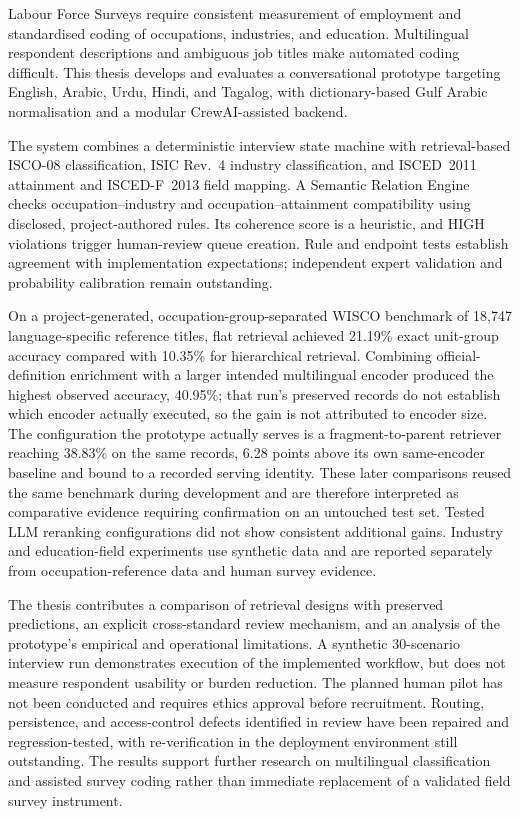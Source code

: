 \documentclass[12pt,a4paper]{report}
\theoremstyle{plain}
\theoremstyle{definition}
\theoremstyle{remark}
\begin{document}
Labour Force Surveys require consistent measurement of employment and
standardised coding of occupations, industries, and education. Multilingual
respondent descriptions and ambiguous job titles make automated coding
difficult. This thesis develops and evaluates a conversational prototype
targeting English, Arabic, Urdu, Hindi, and Tagalog, with dictionary-based
Gulf Arabic normalisation and a modular CrewAI-assisted backend.

The system combines a deterministic interview state machine with
retrieval-based ISCO-08 classification, ISIC Rev.~4 industry classification,
and ISCED~2011 attainment and ISCED-F~2013 field mapping. A Semantic Relation
Engine checks occupation--industry and occupation--attainment compatibility
using disclosed, project-authored rules. Its coherence score is a heuristic,
and HIGH violations trigger human-review queue creation. Rule and endpoint
tests establish agreement with implementation expectations; independent
expert validation and probability calibration remain outstanding.

On a project-generated, occupation-group-separated WISCO benchmark of
18,747 language-specific reference titles, flat retrieval achieved
21.19\% exact unit-group accuracy compared with 10.35\% for hierarchical
retrieval. Combining official-definition enrichment with a larger intended
multilingual encoder produced the highest observed accuracy, 40.95\%;
that run's preserved records do not establish which encoder actually
executed, so the gain is not attributed to encoder size. The configuration
the prototype actually serves is a fragment-to-parent retriever reaching
38.83\% on the same records, 6.28 points above its own same-encoder
baseline and bound to a recorded serving identity.
These later comparisons reused the same benchmark during development and
are therefore interpreted as comparative evidence requiring confirmation
on an untouched test set. Tested LLM reranking configurations did not show
consistent additional gains. Industry and education-field experiments use
synthetic data and are reported separately from occupation-reference data
and human survey evidence.

The thesis contributes a comparison of retrieval designs with preserved predictions,
an explicit cross-standard review mechanism, and an analysis of the
prototype's empirical and operational limitations. A synthetic
30-scenario interview run demonstrates execution of the implemented
workflow, but does not measure respondent usability or burden reduction.
The planned human pilot has not been conducted and requires ethics
approval before recruitment. Routing, persistence, and access-control
defects identified in review have been repaired and regression-tested,
with re-verification in the deployment environment still outstanding. The results
support further research on multilingual classification and assisted
survey coding rather than immediate replacement of a validated field
survey instrument.
\end{document}
